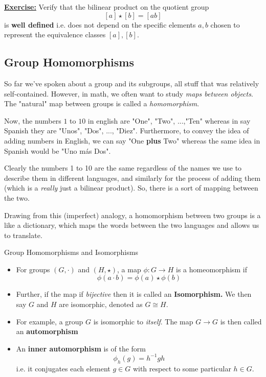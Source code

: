 \documentclass{article}
\begin{document}
\vskip 0.5cm

\begin{dottedbox}
\underline{\textbf{Exercise:}} Verify that the bilinear product on the quotient group
\[ [a] \star [b] = [a b] \]
is \textbf{well defined} i.e. does not depend on the specific elements $a, b$ chosen to represent the equivalence classes $[a], [b]$.
\end{dottedbox}

\vskip 1cm
\subsection{Group Homomorphisms}
\vskip 0.5cm
So far we've spoken about a group and its subgroups, all stuff that was relatively self-contained. However, in math, we often want to study \emph{maps between objects}. The "natural" map between groups is called a \emph{homomorphism}.

\vskip 0.5cm
Now, the numbers $1$ to $10$ in english are "One", "Two", ...,"Ten" whereas in say Spanish they are "Unos", "Dos", ..., "Diez". Furthermore, to convey the idea of adding numbers in English, we can say "One \textbf{plus} Two" whereas the same idea in Spanish would be "Uno más Dos".

\vskip 0.5cm
Clearly the numbers 1 to 10 are the same regardless of the names we use to describe them in different languages, and similarly for the process of adding them (which is a \emph{really} just a bilinear product). So, there is a sort of mapping between the two.

\vskip 0.5cm
Drawing from this (imperfect) analogy, a homomorphism between two groups is a like a dictionary, which maps the words between the two languages and allows us to translate. 

\vskip 0.5cm
\begin{mathdefinitionbox}{Group Homomorphisms and Isomorphisms}
\vskip 0.5cm
\begin{itemize}
  \item For groups $(G, \cdot)$ and $(H, \star)$, a map $\phi : G \rightarrow H$ is a homeomorphism if 
  \[ \phi(a \cdot b) = \phi(a) \star \phi(b) \]

  \item Further, if the map if \emph{bijective} then it is called an \textbf{Isomorphism.} We then say $G$ and $H$ are isomorphic, denoted as $G \cong H$.
\end{itemize}
\end{mathdefinitionbox}

\vskip 0.5cm
\begin{dottedbox}
\begin{itemize}
  \item   For example, a group $G$ is isomorphic to \emph{itself}. The map $G \rightarrow G$ is then called an \textbf{ automorphism} 
  
  \item An \textbf{inner automorphism} is of the form 
  \[ \phi_h(g) = h^{-1}gh \]
  i.e. it conjugates each element $g \in G$ with respect to some particular $h \in G$.
\end{itemize}
\end{dottedbox}
\end{document}
